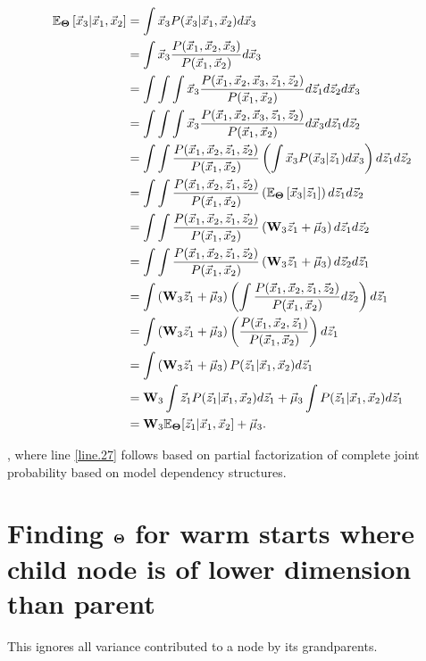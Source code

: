 \begin{align}
    \mathbb{E}_{\bold{\Theta}} \left[ \vec{x}_3 | \vec{x}_1, \vec{x}_2 \right] &= \int \vec{x}_3 P(\vec{x}_3 | \vec{x}_1, \vec{x}_2) d\vec{x}_3 \\
    &= \int \vec{x}_3 \frac{P(\vec{x}_1, \vec{x}_2, \vec{x}_3)}{P(\vec{x}_1, \vec{x}_2)} d\vec{x}_3 \\
    &= \int \int \int \vec{x}_3 \frac{ P(\vec{x}_1, \vec{x}_2, \vec{x}_3 , \vec{z}_1, \vec{z}_2) }{P(\vec{x}_1, \vec{x}_2)} d \vec{z}_1 d\vec{z}_2 d\vec{x}_3 \\ 
    &= \int \int \int \vec{x}_3 \frac{ P(\vec{x}_1, \vec{x}_2, \vec{x}_3 , \vec{z}_1, \vec{z}_2) }{P(\vec{x}_1, \vec{x}_2)} d \vec{x}_3 d\vec{z}_1 d\vec{z}_2 \\ 
    &= \int \int \frac{P(\vec{x}_1, \vec{x}_2, \vec{z}_1, \vec{z}_2)}{P(\vec{x}_1, \vec{x}_2)} \left( \int \vec{x}_3 P(\vec{x}_3 | \vec{z}_1) d \vec{x}_3 \right) d\vec{z}_1 d\vec{z}_2 \label{line.27} \\ 
    &= \int \int \frac{P(\vec{x}_1, \vec{x}_2, \vec{z}_1, \vec{z}_2)}{P(\vec{x}_1, \vec{x}_2)} \left( \mathbb{E}_{\bold{\Theta}} \left[ \vec{x}_3 | \vec{z}_1 \right] \right) d\vec{z}_1 d\vec{z}_2 \\ 
    &= \int \int \frac{P(\vec{x}_1, \vec{x}_2, \vec{z}_1, \vec{z}_2)}{P(\vec{x}_1, \vec{x}_2)} \left( \bold{W}_3 \vec{z}_1 + \vec{\mu}_3 \right) d\vec{z}_1 d\vec{z}_2 \\ 
    &= \int \int \frac{P(\vec{x}_1, \vec{x}_2, \vec{z}_1, \vec{z}_2)}{P(\vec{x}_1, \vec{x}_2)}
      \left( \bold{W}_3 \vec{z}_1 + \vec{\mu}_3 \right) d\vec{z}_2 d\vec{z}_1  \\ 
    &= \int \left( \bold{W}_3 \vec{z}_1 + \vec{\mu}_3 \right) \left( \int \frac{P(\vec{x}_1, \vec{x}_2, \vec{z}_1, \vec{z}_2)}{P(\vec{x}_1, \vec{x}_2)} d\vec{z}_2 \right) d\vec{z}_1 \\ 
    &= \int \left( \bold{W}_3 \vec{z}_1 + \vec{\mu}_3 \right) \left( \frac{P(\vec{x}_1, \vec{x}_2, \vec{z}_1)}{P(\vec{x}_1, \vec{x}_2)} \right) d\vec{z}_1 \\     
    &= \int \left( \bold{W}_3 \vec{z}_1 + \vec{\mu}_3 \right) P(\vec{z}_1 | \vec{x}_1, \vec{x}_2) d\vec{z}_1 \\
    &= \bold{W}_3 \int \vec{z}_1 P(\vec{z}_1 | \vec{x}_1, \vec{x}_2)  d \vec{z}_1 + \vec{\mu}_3 \int P(\vec{z}_1 | \vec{x}_1, \vec{x}_2) d \vec{z}_1 \\ 
    &= \bold{W}_3 \mathbb{E}_{\bold{\Theta}} [\vec{z}_1 | \vec{x}_1, \vec{x}_2] + \vec{\mu}_3
.\end{align}

, where line \ref{line.27} follows based on partial factorization of
complete joint probability based on model dependency structures.

\pagebreak

\section{Finding $\bold{\Theta}$ for warm starts where child node is of
  lower dimension than parent}

This ignores all variance contributed to a node by its grandparents. \\

